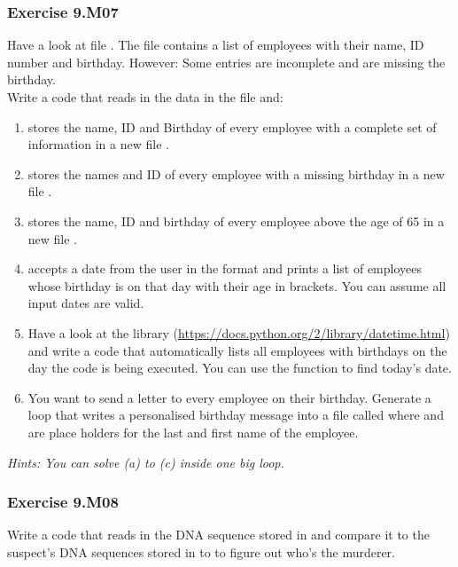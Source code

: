 \subsubsection*{Exercise 9.M07}
Have a look at file {}. The file contains a list of employees with their name, ID number and birthday. However: Some entries are incomplete and are missing the birthday.\\
Write a code that reads in the data in the file and:
\begin{enumerate}[label=(\alph*)]
	\item stores the name, ID and Birthday of every employee with a complete set of
information in a new file {}.
	\item stores the names and ID of every employee with a missing birthday in a new file
{}.
	\item stores the name, ID and birthday of every employee above the age of 65 in a new file
{}.
	\item accepts a date from the user in the format {} and prints a list of employees whose birthday is on that day with their age in brackets. You can assume all input
dates are valid.
	\item Have a look at the {} library (\url{https://docs.python.org/2/library/datetime.html}) and write a code that automatically lists all employees with birthdays on the day the code is being executed. You can use the {} function to find today’s date.
	\item You want to send a letter to every employee on their birthday. Generate a loop that
writes a personalised birthday message into a file called {} where {\code{[LastName]}} and {\code{[FirstName]}} are place holders for the last and first name of the employee.
\end{enumerate}


\textit{Hints:
You can solve (a) to (c) inside one big loop.}\\[1cm]


\subsubsection*{Exercise 9.M08}
Write a code that reads in the DNA sequence stored in {} and compare it to the suspect's DNA sequences stored in {} to {} to figure out who's the murderer.\\

